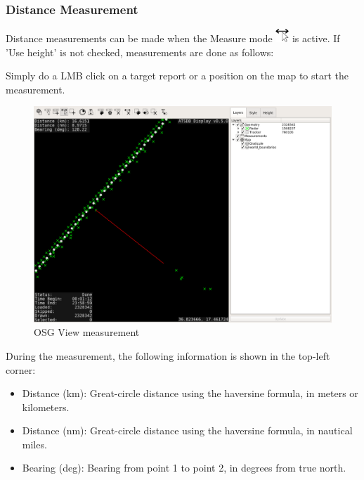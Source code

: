 \subsubsection{Distance Measurement}

Distance measurements can be made when the Measure mode \includegraphics[width=0.5cm,frame]{../../data/icons/measure_action.png} is active. If 'Use height' is not checked, measurements are done as follows:

Simply do a LMB click on a target report or a position on the map to start the measurement.

\begin{figure}[H]
    \hspace*{-2.5cm}
    \includegraphics[width=19cm,frame]{../screenshots/osgview_measure1.png}
  \caption{OSG View measurement}
\end{figure}

During the measurement, the following information is shown in the top-left corner:

\begin{itemize}
 \item Distance (km): Great-circle distance using the haversine formula, in meters or kilometers.
 \item Distance (nm): Great-circle distance using the haversine formula, in nautical miles.
 \item  Bearing (deg): Bearing from point 1 to point 2, in degrees from true north.
\end{itemize}

